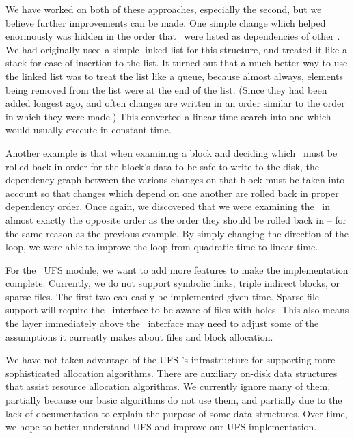 We have worked on both of these approaches, especially the second, but we
believe further improvements can be made. One simple change which helped
enormously was hidden in the order that \chdescs\ were listed as dependencies of
other \chdescs. We had originally used a simple linked list for this structure,
and treated it like a stack for ease of insertion to the list. It turned out
that a much better way to use the linked list was to treat the list like a
queue, because almost always, elements being removed from the list were at the
end of the list. (Since they had been added longest ago, and often changes are
written in an order similar to the order in which they were made.) This
converted a linear time search into one which would usually execute in constant
time.

Another example is that when examining a block and deciding which \chdescs\ must
be rolled back in order for the block's data to be safe to write to the disk,
the dependency graph between the various changes on that block must be taken
into account so that changes which depend on one another are rolled back in
proper dependency order. Once again, we discovered that we were examining the
\chdescs\ in almost exactly the opposite order as the order they should be
rolled back in -- for the same reason as the previous example. By simply
changing the direction of the loop, we were able to improve the loop from
quadratic time to linear time.


For the \Kudos\ UFS module, we want to add more features to make the
implementation complete. Currently, we do not support symbolic links, triple
indirect blocks, or sparse files. The first two can easily be implemented
given time. Sparse file support will require the \LFS\ interface to be aware of
files with holes. This also means the layer immediately above the \LFS\ interface
may need to adjust some of the assumptions it currently makes about files and
block allocation.

We have not taken advantage of the UFS \module's infrastructure for supporting
more sophisticated allocation algorithms. There are auxiliary on-disk data
structures that assist resource allocation algorithms. We currently ignore many
of them, partially because our basic algorithms do not use them, and partially
due to the lack of documentation to explain the purpose of some data
structures. Over time, we hope to better understand UFS and improve our UFS
implementation.

